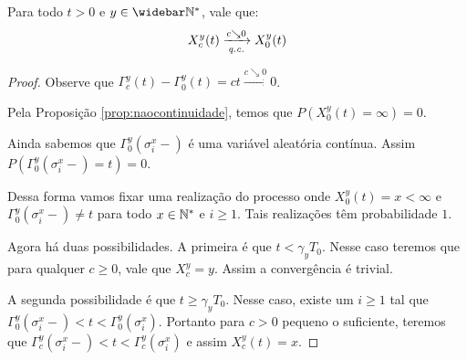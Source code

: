 \begin{lema}
  \label{lema:c_continuo}
  Para todo $t > 0$ e $y \in \Nzb$, vale que:
  \begin{displaymath}
    X_c^y(t) \xrightarrow[{\emph{q.c.}}]{c\searrow 0} X_0^y(t)
  \end{displaymath}
\end{lema}
\begin{proof}
  Observe que $\Gamma^y_c (t) - \Gamma^y_0(t) = ct \xrightarrow{c
    \searrow 0} 0$.

  Pela Proposição \ref{prop:naocontinuidade}, temos que $P(X^y_0(t) =
  \infty) = 0$.

  Ainda sabemos que $\Gamma^y_0(\sigma^x_i-)$ é uma variável aleatória
  contínua. Assim $P( \Gamma^y_0(\sigma^x_i-) = t) = 0$.

  Dessa forma vamos fixar uma realização do processo onde $X^y_0(t) =
  x < \infty$ e $\Gamma^y_0(\sigma^x_i-) \neq t$ para todo $x \in {\mathbb{N^*}}$
  e $i \geq 1$. Tais realizações têm probabilidade $1$.


  Agora há duas possibilidades. A primeira é que $t < \gamma_y
  T_0$. Nesse caso teremos que para qualquer $c \geq 0$, vale que
  $X^y_c = y$. Assim a convergência é trivial.

  A segunda possibilidade é que $t \geq \gamma_y T_0$. Nesse caso,
  existe um $i \geq 1$ tal que $\Gamma^y_0(\sigma^x_i-) < t <
  \Gamma^y_0(\sigma^x_i)$. Portanto para $c > 0$ pequeno o suficiente,
  teremos que $\Gamma^y_c(\sigma^x_i-) < t < \Gamma^y_c(\sigma^x_i)$ e
  assim $X_c^y(t) = x$.
\end{proof}

